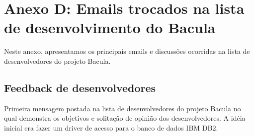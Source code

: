 % 
% 
% 
% 

\section{Anexo D: Emails trocados na lista de desenvolvimento do Bacula} \label{sec:anexod}
Neste anexo, apresentamos os principais emails e discussões ocorridas na lista de desenvolvedores do projeto Bacula. 

\subsection{Feedback de desenvolvedores}\label{sec:anexod:feedback}
Primeira mensagem postada na lista de desenvolvedores do projeto Bacula no qual demonstra os objetivos e solitação de opinião dos desenvolvedores. A idéia inicial era fazer um driver de acesso para o banco de dados IBM DB2.


